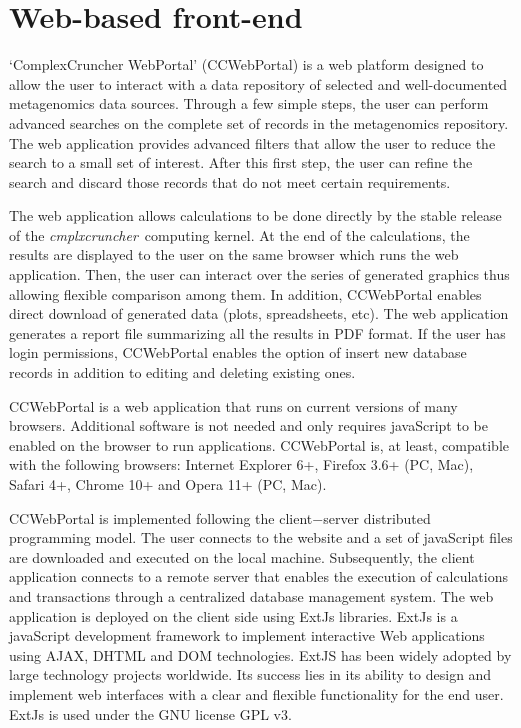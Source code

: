 \documentclass[12pt,oneside,letterpaper]{article}
\newcommand{\CC}[0]{\emph{cmplxcruncher}}
\begin{document}
\section{Web-based front-end}

`ComplexCruncher WebPortal' (CCWebPortal) is a web platform designed to allow the user to interact with a data repository of selected and well-documented metagenomics data sources. Through a few simple steps, the user can perform advanced searches on the complete set of records in the metagenomics repository.  The web application provides advanced filters that allow the user to reduce the search to a small set of interest. After this first step, the user can refine the search and discard those records that do not meet certain requirements.

The web application allows calculations to be done directly by the stable release of the \CC\ computing kernel. At the end of the calculations, the results are displayed to the user on the same browser which runs the web application. Then, the user can interact over the series of generated graphics thus allowing flexible comparison among them. In addition, CCWebPortal enables direct download of generated data (plots, spreadsheets, etc). The web application generates a report file summarizing all the results in PDF format. If the user has login permissions, CCWebPortal enables the option of insert new database records in addition to editing and deleting existing ones.

CCWebPortal is a web application that runs on current versions of many browsers. Additional software is not needed and only requires javaScript to be enabled on the browser to run applications. CCWebPortal is, at least, compatible with the following browsers: Internet Explorer 6+, Firefox 3.6+ (PC, Mac), Safari 4+, Chrome 10+ and Opera 11+ (PC, Mac).

CCWebPortal is implemented following the client$-$server distributed programming model. The user connects to the website and a set of javaScript files are downloaded and executed on the local machine. Subsequently, the client application connects to a remote server that enables the execution of calculations and transactions through a centralized database management system. The web application is deployed on the client side using ExtJs libraries. ExtJs is a javaScript development framework to implement interactive Web applications using AJAX, DHTML and DOM technologies. ExtJS has been widely adopted by large technology projects worldwide. Its success lies in its ability to design and implement web interfaces with a clear and flexible functionality for the end user. ExtJs is used under the GNU license GPL v3.
\end{document}
